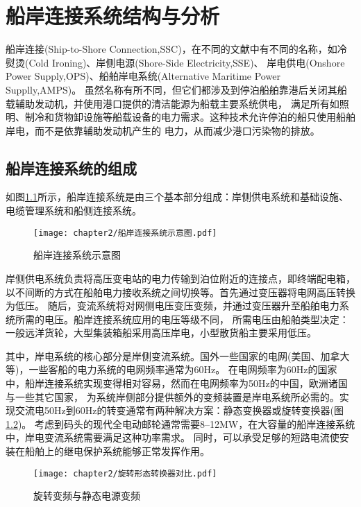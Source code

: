 \chapter{船岸连接系统结构与分析}

船岸连接(Ship-to-Shore Connection,SSC)，在不同的文献中有不同的名称，如冷熨烫(Cold Ironing)、岸侧电源(Shore-Side Electricity,SSE)、
岸电供电(Onshore Power Supply,OPS)、船舶岸电系统(Alternative Maritime Power Supplly,AMPS)。
虽然名称有所不同，但它们都涉及到停泊船舶靠港后关闭其船载辅助发动机，并使用港口提供的清洁能源为船载主要系统供电，
满足所有如照明、制冷和货物卸设施等船载设备的电力需求。这种技术允许停泊的船只使用船舶岸电，而不是依靠辅助发动机产生的
电力，从而减少港口污染物的排放。

\section{船岸连接系统的组成}

如图\ref{fig:船岸连接系统示意图}所示，船岸连接系统是由三个基本部分组成：岸侧供电系统和基础设施、电缆管理系统和船侧连接系统。

\begin{figure}[!htp]
	\centering
	\texttt{[image: chapter2/船岸连接系统示意图.pdf]}
	\caption{船岸连接系统示意图}
	\label{fig:船岸连接系统示意图}
\end{figure}

岸侧供电系统负责将高压变电站的电力传输到泊位附近的连接点，即终端配电箱，以不间断的方式在船舶电力接收系统之间切换等。首先通过变压器将电网高压转换为低压。
随后，变流系统将对网侧电压变压变频，并通过变压器升至船舶电力系统所需的电压。船岸连接系统应用的电压等级不同，
所需电压由船舶类型决定：一般远洋货轮，大型集装箱船采用高压岸电，小型散货船主要采用低压。

其中，岸电系统的核心部分是岸侧变流系统。国外一些国家的电网(美国、加拿大等)，一些客船的电力系统的电网频率通常为60Hz。
在电网频率为60Hz的国家中，船岸连接系统实现变得相对容易，然而在电网频率为50Hz的中国，欧洲诸国与一些其它国家，
为系统岸侧部分提供额外的变频装置是岸电系统所必需的。实现交流电50Hz到60Hz的转变通常有两种解决方案：静态变换器或旋转变换器(图\ref{fig:传统旋转变频与静态电源变频对比})。
考虑到码头的现代全电动邮轮通常需要8–12\si{MW}\cite{SP15}，在大容量的船岸连接系统中，岸电变流系统需要满足这种功率需求。
同时，可以承受足够的短路电流使安装在船舶上的继电保护系统能够正常发挥作用。

\begin{figure}[!htp]
	\centering
	\texttt{[image: chapter2/旋转形态转换器对比.pdf]}
	\caption{旋转变频与静态电源变频}
	\label{fig:传统旋转变频与静态电源变频对比}
\end{figure}

